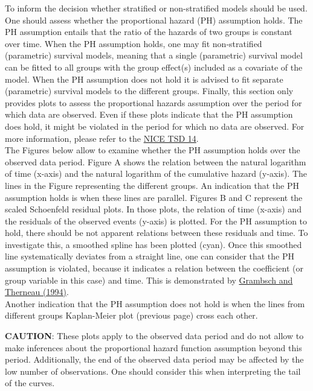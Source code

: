 \documentclass[]{article}
\begin{document}
To inform the decision whether stratified or non-stratified models
should be used. One should assess whether the proportional hazard (PH)
assumption holds. The PH assumption entails that the ratio of the
hazards of two groups is constant over time. When the PH assumption
holds, one may fit non-stratified (parametric) survival models, meaning
that a single (parametric) survival model can be fitted to all groups
with the group effect(s) included as a covariate of the model. When the
PH assumption does not hold it is advised to fit separate (parametric)
survival models to the different groups. Finally, this section only
provides plots to assess the proportional hazards assumption over the
period for which data are observed. Even if these plots indicate that
the PH assumption does hold, it might be violated in the period for
which no data are observed. For more information, please refer to the
\href{http://nicedsu.org.uk/wp-content/uploads/2016/03/NICE-DSU-TSD-Survival-analysis.updated-March-2013.v2.pdf}{NICE
TSD 14}.\\
The Figures below allow to examine whether the PH assumption holds over
the observed data period. Figure A shows the relation between the
natural logarithm of time (x-axis) and the natural logarithm of the
cumulative hazard (y-axis). The lines in the Figure representing the
different groups. An indication that the PH assumption holds is when
these lines are parallel. Figures B and C represent the scaled
Schoenfeld residual plots. In those plots, the relation of time (x-axis)
and the residuals of the observed events (y-axis) is plotted. For the PH
assumption to hold, there should be not apparent relations between these
residuals and time. To investigate this, a smoothed spline has been
plotted (cyan). Once this smoothed line systematically deviates from a
straight line, one can consider that the PH assumption is violated,
because it indicates a relation between the coefficient (or group
variable in this case) and time. This is demonstrated by
\href{https://doi.org/10.1093/biomet/81.3.515}{Grambsch and Therneau
(1994)}.\\
Another indication that the PH assumption does not hold is when the
lines from different groups Kaplan-Meier plot (previous page) cross each
other.

\textbf{CAUTION}: These plots apply to the observed data period and do
not allow to make inferences about the proportional hazard function
assumption beyond this period. Additionally, the end of the observed
data period may be affected by the low number of observations. One
should consider this when interpreting the tail of the curves.
\end{document}
